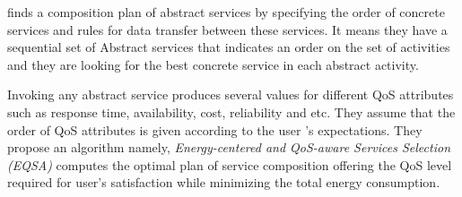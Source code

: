 \documentclass{sigchi}
\begin{document}
\cite{DBLP:journals/tase/KhanoucheACKY16} finds a composition plan of abstract services by specifying the order of concrete services and rules for data transfer between these services. It means they have a sequential set of Abstract services that indicates an order on the set of activities and they are looking for the best concrete service in each abstract activity. 

Invoking any abstract service produces several values for different QoS attributes such as response time, availability, cost, reliability and etc. They assume that the order of QoS attributes is given according to the user 's expectations. They propose an algorithm namely, \emph{Energy-centered and QoS-aware Services Selection (EQSA)} computes the optimal plan of service composition offering the QoS level required for user's satisfaction while minimizing the total energy consumption.
\end{document}
